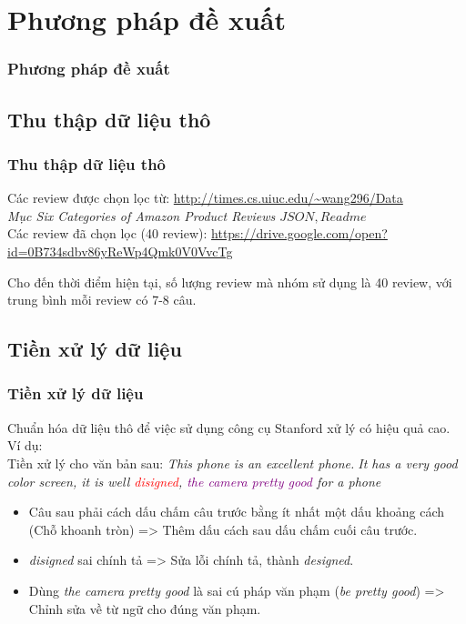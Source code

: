 \documentclass{beamer}
\begin{document}
\section{Phương pháp đề xuất}
\begin{frame}
\frametitle{Phương pháp đề xuất}

\end{frame}

\subsection{Thu thập dữ liệu thô}
\begin{frame}
\frametitle{Thu thập dữ liệu thô}

\begin{block}{}
Các review được chọn lọc từ: 
\url{http://times.cs.uiuc.edu/~wang296/Data}
\\ \textit{Mục Six Categories of Amazon Product Reviews \(JSON, Readme\)}
\\Các review đã chọn lọc (40 review):
\url{https://drive.google.com/open?id=0B734sdbv86yReWp4Qmk0V0VvcTg}
\end{block}

\begin{block}{}
Cho đến thời điểm hiện tại, số lượng review mà nhóm sử dụng là 40 review, với trung bình mỗi review có 7-8 câu.
\end{block}

\end{frame}

\subsection{Tiền xử lý dữ liệu}
\begin{frame}
\frametitle{Tiền xử lý dữ liệu}
\begin{block}{}
Chuẩn hóa dữ liệu thô để việc sử dụng công cụ Stanford xử lý có hiệu quả cao.
\\Ví dụ: 
\\Tiền xử lý cho văn bản sau: \textit{This phone is an excellent phone\textcircled{.}It has a very good color screen, it is well \textcolor{red}{disigned}, \textcolor{purple}{the camera pretty good} for a phone}
\begin{itemize}
\item Câu sau phải cách dấu chấm câu trước bằng ít nhất một dấu khoảng cách (Chỗ khoanh tròn) => Thêm dấu cách sau dấu chấm cuối câu trước.
\item \textit{disigned} sai chính tả => Sửa lỗi chính tả, thành \textit{designed}.
\item Dùng \textit{the camera pretty good} là sai cú pháp văn phạm (\textit{be pretty good}) => Chỉnh sửa về từ ngữ cho đúng văn phạm.
\end{itemize}
\end{block}
\end{frame}
\end{document}
